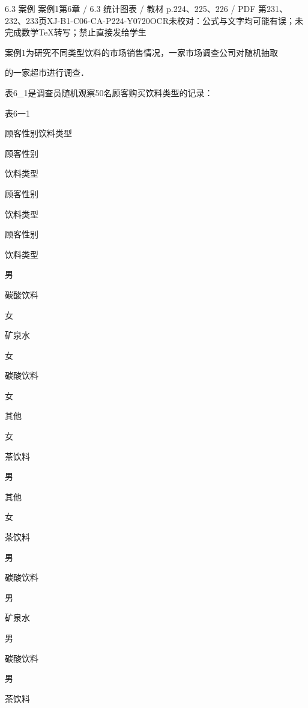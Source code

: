 \begin{bankitem}{6.3 案例 案例1}{第6章 / 6.3 统计图表 / 教材 p.224、225、226 / PDF 第231、232、233页}{XJ-B1-C06-CA-P224-Y0720}{OCR未校对：公式与文字均可能有误；未完成数学TeX转写；禁止直接发给学生}
\begin{ocrdraft}
\par
案例1为研究不同类型饮料的市场销售情况，一家市场调查公司对随机抽取
\par
的一家超市进行调查．
\par
表6\_1是调查员随机观察50名顾客购买饮料类型的记录：
\par
表6一1
\par
顾客性别饮料类型
\par
顾客性别
\par
饮料类型
\par
顾客性别
\par
饮料类型
\par
顾客性别
\par
饮料类型
\par
男
\par
碳酸饮料
\par
女
\par
矿泉水
\par
女
\par
碳酸饮料
\par
女
\par
其他
\par
女
\par
茶饮料
\par
男
\par
其他
\par
女
\par
茶饮料
\par
男
\par
碳酸饮料
\par
男
\par
矿泉水
\par
男
\par
碳酸饮料
\par
男
\par
茶饮料
\par

\end{ocrdraft}
\end{bankitem}
